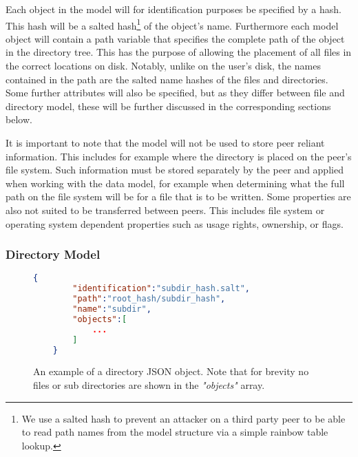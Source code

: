 Each object in the model will for identification purposes be specified by a hash.
This hash will be a salted hash\footnote{We use a salted hash to prevent an attacker on a third party peer to be able to read path names from the model structure via a simple rainbow table lookup.} of the object's name.
Furthermore each model object will contain a path variable that specifies the complete path of the object in the directory tree.
This has the purpose of allowing the placement of all files in the correct locations on disk.
Notably, unlike on the user's disk, the names contained in the path are the salted name hashes of the files and directories.
Some further attributes will also be specified, but as they differ between file and directory model, these will be further discussed in the corresponding sections below.

It is important to note that the model will not be used to store peer reliant information.
This includes for example where the directory is placed on the peer's file system.
Such information must be stored separately by the peer and applied when working with the data model, for example when determining what the full path on the file system will be for a file that is to be written.
Some properties are also not suited to be transferred between peers.
This includes file system or operating system dependent properties such as usage rights, ownership, or flags.

\subsubsection{Directory Model}
\label{sec:dir_model}

\begin{figure}[htp]
    \begin{lstlisting}[language=json,firstnumber=0]
    {
        "identification":"subdir_hash.salt",
        "path":"root_hash/subdir_hash",
        "name":"subdir",
        "objects":[
            ...
        ]
    }
    \end{lstlisting}
\caption[Directory JSON Model]{An example of a directory JSON object. Note that for brevity no files or sub directories are shown in the \textit{"objects"} array.}
\label{json:directory_model}
\end{figure}

